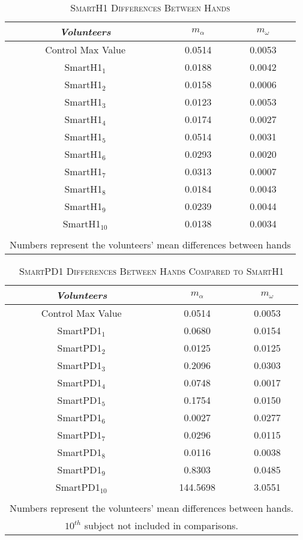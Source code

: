 \begin{table}[!htp]
\centering
\caption{\textsc{SmartH1 Differences Between Hands}}
\begin{tabular*}{1\textwidth}{@{\extracolsep{\fill}} c  c  c}
 	\textit{Volunteers} & $m_{\alpha}$ & $m_{\omega}$\\
	\hline 	\hline 		
 	Control Max Value & 0.0514 & 0.0053 \\ 
 	\hline
 	\gls{SmartH1}$_{1}$ & 0.0188 & 0.0042\\ 
 	\gls{SmartH1}$_{2}$ & 0.0158 & 0.0006\\ 
 	\gls{SmartH1}$_{3}$ & 0.0123 & 0.0053\\ 
 	\gls{SmartH1}$_{4}$ & 0.0174 & 0.0027\\ 
 	\gls{SmartH1}$_{5}$ & 0.0514 & 0.0031\\ 
 	\gls{SmartH1}$_{6}$ & 0.0293 & 0.0020\\
 	\gls{SmartH1}$_{7}$ & 0.0313 & 0.0007\\
 	\gls{SmartH1}$_{8}$ & 0.0184 & 0.0043\\
 	\gls{SmartH1}$_{9}$ & 0.0239 & 0.0044\\
 	\gls{SmartH1}$_{10}$ & 0.0138 & 0.0034\\
 	 &  & \\
	\multicolumn{3}{c}{Numbers represent the volunteers' mean differences between hands} 	\\
\end{tabular*}
\label{table:difSmartH1}
\end{table}

\begin{table}[!htp]
\centering
\caption{\textsc{SmartPD1 Differences Between Hands Compared to SmartH1}}
\begin{tabular*}{1\textwidth}{@{\extracolsep{\fill}} c  c  c}
 	\textit{Volunteers} & $m_{\alpha}$ & $m_{\omega}$\\
	\hline 	\hline 		
 	Control Max Value & 0.0514 & 0.0053 \\ 
 	\hline
 	\gls{SmartPD1}$_{1}$ & 0.0680 & 	0.0154 \\
 	\gls{SmartPD1}$_{2}$ & 0.0125 & 	0.0125 \\
 	\gls{SmartPD1}$_{3}$ & 0.2096 & 	0.0303 \\
 	\gls{SmartPD1}$_{4}$ & 0.0748 & 	0.0017 \\
 	\gls{SmartPD1}$_{5}$ & 0.1754 & 	0.0150 \\
 	\gls{SmartPD1}$_{6}$ & 0.0027 & 	0.0277 \\
 	\gls{SmartPD1}$_{7}$ & 0.0296 & 	0.0115 \\
 	\gls{SmartPD1}$_{8}$ & 0.0116 & 	0.0038 \\
 	\gls{SmartPD1}$_{9}$ & 0.8303 &  0.0485\\
 	\gls{SmartPD1}$_{10}$ & 144.5698 &	3.0551 \\
 	 &  & \\
	\multicolumn{3}{c}{Numbers represent the volunteers' mean differences between hands.} 	\\
	\multicolumn{3}{c}{$10^{th}$ subject not included in comparisons.} \\
\end{tabular*}
\label{table:difSmartPD1}
\end{table}


